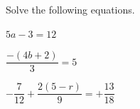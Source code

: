  Solve the following equations.

\begin{subparts}
  \item $5a-3=12$
  \item $\dfrac{-(4b+2)}{3}=5$
  \item $-\dfrac{7}{12}+\dfrac{2(5-r)}{9}=+\dfrac{13}{18}$
\end{subparts}

